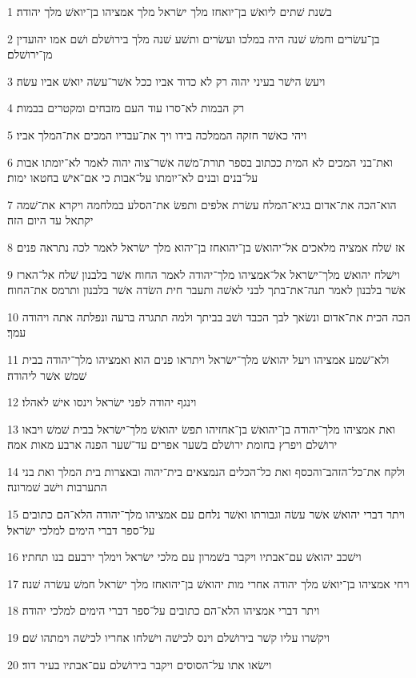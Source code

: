 \par 1 בשׁנת שׁתים ליואשׁ בן־יואחז מלך ישׂראל מלך אמציהו בן־יואשׁ מלך יהודה׃
\par 2 בן־עשׂרים וחמשׁ שׁנה היה במלכו ועשׂרים ותשׁע שׁנה מלך בירושׁלם ושׁם אמו יהועדין מן־ירושׁלם׃
\par 3 ויעשׂ הישׁר בעיני יהוה רק לא כדוד אביו ככל אשׁר־עשׂה יואשׁ אביו עשׂה׃
\par 4 רק הבמות לא־סרו עוד העם מזבחים ומקטרים בבמות׃
\par 5 ויהי כאשׁר חזקה הממלכה בידו ויך את־עבדיו המכים את־המלך אביו׃
\par 6 ואת־בני המכים לא המית ככתוב בספר תורת־משׁה אשׁר־צוה יהוה לאמר לא־יומתו אבות על־בנים ובנים לא־יומתו על־אבות כי אם־אישׁ בחטאו ימות׃
\par 7 הוא־הכה את־אדום בגיא־המלח עשׂרת אלפים ותפשׂ את־הסלע במלחמה ויקרא את־שׁמה יקתאל עד היום הזה׃
\par 8 אז שׁלח אמציה מלאכים אל־יהואשׁ בן־יהואחז בן־יהוא מלך ישׂראל לאמר לכה נתראה פנים׃
\par 9 וישׁלח יהואשׁ מלך־ישׂראל אל־אמציהו מלך־יהודה לאמר החוח אשׁר בלבנון שׁלח אל־הארז אשׁר בלבנון לאמר תנה־את־בתך לבני לאשׁה ותעבר חית השׂדה אשׁר בלבנון ותרמס את־החוח׃
\par 10 הכה הכית את־אדום ונשׂאך לבך הכבד ושׁב בביתך ולמה תתגרה ברעה ונפלתה אתה ויהודה עמך׃
\par 11 ולא־שׁמע אמציהו ויעל יהואשׁ מלך־ישׂראל ויתראו פנים הוא ואמציהו מלך־יהודה בבית שׁמשׁ אשׁר ליהודה׃
\par 12 וינגף יהודה לפני ישׂראל וינסו אישׁ לאהלו׃
\par 13 ואת אמציהו מלך־יהודה בן־יהואשׁ בן־אחזיהו תפשׂ יהואשׁ מלך־ישׂראל בבית שׁמשׁ ויבאו ירושׁלם ויפרץ בחומת ירושׁלם בשׁער אפרים עד־שׁער הפנה ארבע מאות אמה׃
\par 14 ולקח את־כל־הזהב־והכסף ואת כל־הכלים הנמצאים בית־יהוה ובאצרות בית המלך ואת בני התערבות וישׁב שׁמרונה׃
\par 15 ויתר דברי יהואשׁ אשׁר עשׂה וגבורתו ואשׁר נלחם עם אמציהו מלך־יהודה הלא־הם כתובים על־ספר דברי הימים למלכי ישׂראל׃
\par 16 וישׁכב יהואשׁ עם־אבתיו ויקבר בשׁמרון עם מלכי ישׂראל וימלך ירבעם בנו תחתיו׃
\par 17 ויחי אמציהו בן־יואשׁ מלך יהודה אחרי מות יהואשׁ בן־יהואחז מלך ישׂראל חמשׁ עשׂרה שׁנה׃
\par 18 ויתר דברי אמציהו הלא־הם כתובים על־ספר דברי הימים למלכי יהודה׃
\par 19 ויקשׁרו עליו קשׁר בירושׁלם וינס לכישׁה וישׁלחו אחריו לכישׁה וימתהו שׁם׃
\par 20 וישׂאו אתו על־הסוסים ויקבר בירושׁלם עם־אבתיו בעיר דוד׃
